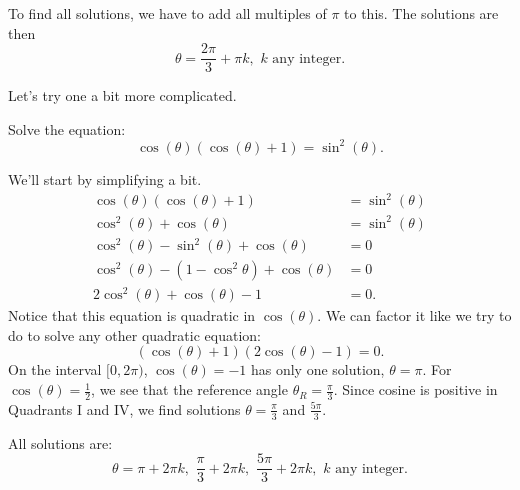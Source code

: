 \documentclass[nooutcomes]{ximera}
\begin{document}
\begin{example}
\begin{explanation}
		To find all solutions, we have to add all multiples of $\pi$ to this.  
		The solutions are then $$ \theta = \frac{2\pi}{3}+ \pi k , \,\, k \textrm{ any integer}. $$
				
	\end{explanation}
\end{example}

Let's try one a bit more complicated.
\begin{example}
	Solve the equation: \[ \cos(\theta) \left( \cos(\theta) + 1\right) = \sin^2(\theta). \]
	\begin{explanation}
		We'll start by simplifying a bit.
		\begin{align*}
			\cos(\theta) \left( \cos(\theta) + 1\right) &= \sin^2(\theta) \\
			\cos^2(\theta) + \cos(\theta) &= \sin^2(\theta) \\
			\cos^2(\theta) - \sin^2(\theta) + \cos(\theta) &= 0\\
			\cos^2(\theta) - \left(1-\cos^2\theta\right) + \cos(\theta) &= 0\\
			2\cos^2(\theta) + \cos(\theta) - 1 &= 0.
		\end{align*}
		Notice that this equation is quadratic in $\cos(\theta)$.  We can factor it like we try to do to solve any other quadratic equation:
		\[ \left( \cos(\theta) + 1 \right) \left( 2 \cos(\theta) - 1\right) = 0.\]
		On the interval $[0, 2\pi)$, $\cos(\theta) = -1$ has only one solution, $\theta = {\pi}$.  
		For $\cos(\theta) = \frac{1}{2}$, we see that the reference angle $\theta_R = {\frac{\pi}{3}}$.  Since cosine is positive in Quadrants I and IV,
		we find solutions $\theta = \frac{\pi}{3}$ and $\frac{5\pi}{3}$.
		
		All solutions are:
		\[ \theta = \pi + 2 \pi k, \,\, \frac{\pi}{3}+ 2 \pi k ,\,\, \frac{5\pi}{3} + 2\pi k, \,\, k \textrm{ any integer.} \]
	\end{explanation}
\end{example}
\end{document}
